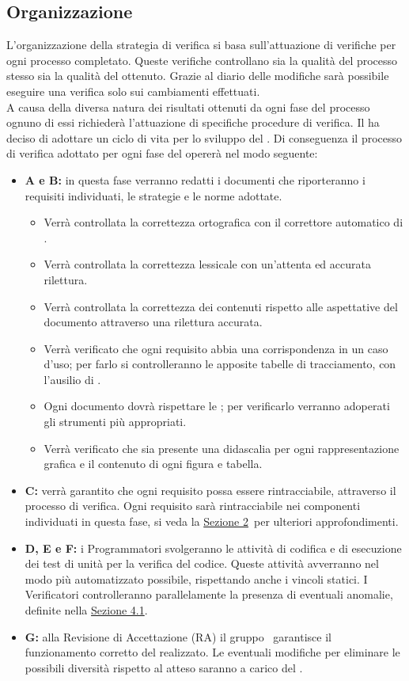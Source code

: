 	\subsection{Organizzazione}
		L'organizzazione della strategia di verifica si basa sull'attuazione di verifiche per ogni processo completato. Queste verifiche controllano sia la qualità del processo stesso sia la qualità del  ottenuto. Grazie al diario delle modifiche sarà possibile eseguire una verifica solo sui cambiamenti effettuati. \\
		A causa della diversa natura dei risultati ottenuti da ogni fase del processo ognuno di essi richiederà l'attuazione di specifiche procedure di verifica. Il  ha deciso di adottare un ciclo di vita  per lo sviluppo del . Di conseguenza il processo di verifica adottato per ogni fase del  opererà nel modo seguente:
		\begin{itemize}
			\item \textbf{A e B:} in questa fase verranno redatti i documenti che riporteranno i requisiti individuati, le strategie e le norme adottate.
			\begin{itemize}
				\item Verrà controllata la correttezza ortografica con il correttore automatico di .
				\item Verrà controllata la correttezza lessicale con un'attenta ed accurata rilettura.
				\item Verrà controllata la correttezza dei contenuti rispetto alle aspettative del documento attraverso una rilettura accurata.
				\item Verrà verificato che ogni requisito abbia una corrispondenza in un caso d'uso; per farlo si controlleranno le apposite tabelle di tracciamento, con l'ausilio di .
				\item Ogni documento dovrà rispettare le \NPdoc; per verificarlo verranno adoperati gli strumenti più appropriati.
				\item Verrà verificato che sia presente una didascalia per ogni rappresentazione grafica e il contenuto di ogni figura e tabella.
			\end{itemize}
			\item \textbf{C:} verrà garantito che ogni requisito possa essere rintracciabile, attraverso il processo di verifica. Ogni requisito sarà rintracciabile nei componenti individuati in questa fase, si veda la \hyperref[sec:2]{Sezione 2}\ per ulteriori approfondimenti.
			\item \textbf{D, E e F:} i Programmatori svolgeranno le attività di codifica e di esecuzione dei test di unità per la verifica del codice. Queste attività avverranno nel modo più automatizzato possibile, rispettando anche i vincoli statici. I Verificatori controlleranno parallelamente la presenza di eventuali anomalie, definite nella \hyperref[sec:4.1]{Sezione 4.1}.
			\item \textbf{G:} alla Revisione di Accettazione (RA) il gruppo \AUTORE\ garantisce il funzionamento corretto del  realizzato. Le eventuali modifiche per eliminare le possibili diversità rispetto al  atteso saranno a carico del .
		\end{itemize}
